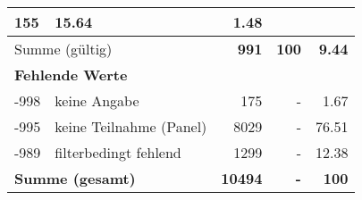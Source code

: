 \begin{longtable}{lXrrr}
       \num{155} &
       \num[round-mode=places,round-precision=2]{15,64} &
         \num[round-mode=places,round-precision=2]{1,48} \\
     \midrule
     \multicolumn{2}{l}{Summe (gültig)} &
       \textbf{\num{991}} &
     \textbf{100} &
       \textbf{\num[round-mode=places,round-precision=2]{9,44}} \\
     \multicolumn{5}{l}{\textbf{Fehlende Werte}}\\
       -998 &
       keine Angabe &
         \num{175} &
        - &
         \num[round-mode=places,round-precision=2]{1,67} \\
       -995 &
       keine Teilnahme (Panel) &
         \num{8029} &
        - &
         \num[round-mode=places,round-precision=2]{76,51} \\
       -989 &
       filterbedingt fehlend &
         \num{1299} &
        - &
         \num[round-mode=places,round-precision=2]{12,38} \\
     \midrule
     \multicolumn{2}{l}{\textbf{Summe (gesamt)}} &
          \textbf{\num{10494}} &
        \textbf{-} &
        \textbf{100} \\
     \bottomrule
     \end{longtable}
     
